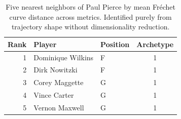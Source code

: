 \begin{table}[htbp]
  \centering\small
  \begin{tabular}{rllc}
    \toprule
    Rank & Player & Position & Archetype \\
    \midrule
    1 & Dominique Wilkins & F & 1 \\
    2 & Dirk Nowitzki & F & 1 \\
    3 & Corey Maggette & G & 1 \\
    4 & Vince Carter & G & 1 \\
    5 & Vernon Maxwell & G & 1 \\
    \bottomrule
  \end{tabular}
  \caption{Five nearest neighbors of Paul Pierce by mean Fr\'{e}chet curve distance across metrics. Identified purely from trajectory shape without dimensionality reduction.}
  \label{tab:Paul_Pierce_frechet_curve_neighbors}
\end{table}

